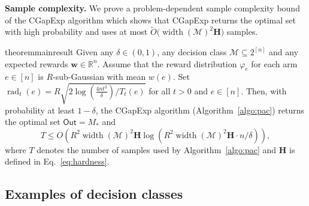 \documentclass{article}
\newcommand{\junk}[1]{}
\newcommand{\Algorithm}{{\small \textsf{CGapExp}}\xspace}
\newcommand{\Rew}{\varphi}
\newcommand{\M}{\mathcal M}
\newcommand{\B}{\mathcal B}
\newcommand{\RR}{\mathbb R}
\DeclareMathOperator{\rank}{width}
\DeclareMathOperator{\rad}{rad}
\newcommand{\out}{\mathsf{Out}}
\newcommand{\MultiIdent}{\textsc{TopK}\xspace}
\newcommand{\Matroid}{\textsc{Matroid}\xspace}
\newcommand{\Match}{\textsc{Match}\xspace}
\newcommand{\Path}{\textsc{Path}\xspace}
\renewcommand{\vec}[1]{\boldsymbol{#1}}
\begin{document}
\textbf{Sample complexity.} 
We prove a problem-dependent sample complexity bound of the \Algorithm algorithm
which shows that \Algorithm returns the optimal set with high probability and uses at most $\tilde O\big(\rank(\M)^2 \mathbf H\big)$ samples.
\begin{restatable}{theorem}{mainresult}
Given any $\delta \in (0,1)$, any decision class $\M \subseteq 2^{[n]}$ and any expected rewards $\vec w \in \RR^{n}$.
Assume that the reward distribution $\Rew_e$ for each arm $e\in [n]$ is  $R$-sub-Gaussian with mean $w(e)$.
Set $\rad_t(e) = R\sqrt{2\log\left(\frac{4n t^2}\delta\right)/ T_t(e) }$ for all $t > 0$ and $e\in[n]$.
Then, with probability at least $1-\delta$, the \Algorithm algorithm (Algorithm~\ref{algo:pac}) returns the optimal set $\out=M_*$ and
\begin{equation}
\label{eq:sample-complexity}
T \le O\left(R^2\rank(\M)^2\mathbf H\log\left(R^2\rank(\M)^2\mathbf H \cdot n/\delta\right)\right),
\end{equation}
where $T$ denotes the number of samples used by Algorithm~\ref{algo:pac} and $\mathbf H$ is defined in Eq.~\eqref{eq:hardness}.
\label{theorem:main}
\end{restatable}
\junk{
By combining Lemma~\ref{lemma:example-exchange-class} and Theorem~\ref{theorem:main}, we can bound the sample complexity of \Algorithm for our running examples.
\begin{corollary}
\begin{itemize}
	\item \MultiIdent. $T \le O\big(\mathbf H \log(n\mathbf H/\delta)\big)$.
	\item \Matroid. $T \le O\big(\mathbf H \log(n\mathbf H/\delta)\big)$.
	\item \Match. $T \le O\big(|V|^2 \mathbf H \log(n |V|^2 \mathbf H/\delta)\big)$.
	\item \Path. $T \le O\big(|V|^2 \mathbf H \log(n |V|^2 \mathbf H/\delta)\big)$.
\end{itemize}
\end{corollary}
}


\subsection{Examples of decision classes}
\end{document}
